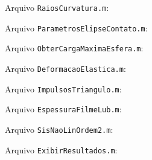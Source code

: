\documentclass[12pt,oneside,english,brazil,lmodern,siglas,simbolos,cite=num]{ucsmonograph}
\begin{document}
	Arquivo \texttt{RaiosCurvatura.m}:
	
	
	Arquivo \texttt{ParametrosElipseContato.m}:
	
	
	Arquivo \texttt{ObterCargaMaximaEsfera.m}:
	
	
	Arquivo \texttt{DeformacaoElastica.m}:
	
	
	Arquivo \texttt{ImpulsosTriangulo.m}:
	
	
	Arquivo \texttt{EspessuraFilmeLub.m}:
	
	
	Arquivo \texttt{SisNaoLinOrdem2.m}:
	
	
	Arquivo \texttt{ExibirResultados.m}:
	
\end{document}
